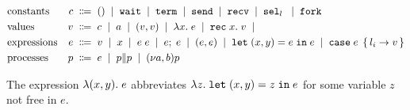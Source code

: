 \begin{align*}
  &\text{constants}&
                     c \grmdef & \EUnit \grmor \EkwWait \grmor \EkwTerm \grmor \EkwSend \grmor \EkwRecv \grmor \ESelect l \grmor \EkwFork \\
  &\text{values}&
                   v \grmdef&
    c                        \grmor
    a                        \grmor
    (v, v)                   \grmor
    \ELam x e                \grmor
    \ERec x v                \grmor
  \\
  &\text{expressions}&
                       e \grmdef&
    v                       \grmor
    x                       \grmor
    e \; e                  \grmor
    \ELetU e e              \grmor
    (e, e)                  \grmor
    \ELetP x y e e          \grmor
         \ECase e { l_i \rightarrow v }
  \\
  & \text{processes}&
  p \grmdef&
    e                       \grmor
    \PPar p p               \grmor
    \PScope p
\end{align*}

The expression $\lambda (x,y).\; e$ abbreviates $\lambda z.\; \mathtt{let}\; (x,y) = z \;\mathtt{in}\; e$
for some variable $z$ not free in $e$.


